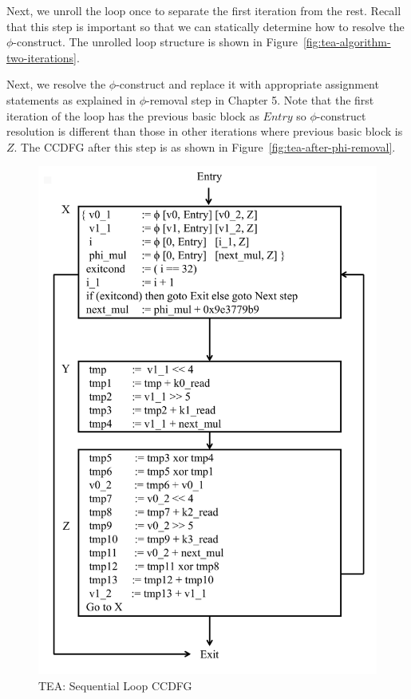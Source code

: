 Next, we unroll the loop once to separate the first iteration from the rest. Recall that this step is important so that we can statically determine how to resolve the 
$\phi$-construct. The unrolled loop structure is shown in Figure~\ref{fig:tea-algorithm-two-iterations}.

Next, we resolve the $\phi$-construct and replace it with appropriate assignment statements as explained in $\phi$-removal step in Chapter 5. Note that the
first iteration of the loop has the previous basic block as $Entry$ so $\phi$-construct resolution is different than those in other iterations where previous basic block is $Z$. The CCDFG after this step is as shown in Figure~\ref{fig:tea-after-phi-removal}.

\begin{figure}[H]
\begin{center}
\includegraphics[width=4.75in]{fig-proposal/tea-seq-ccdfg}
\caption{TEA: Sequential Loop CCDFG}
\label{fig:tea-seq-loop-ccdfg}
\end{center}
\end{figure}


